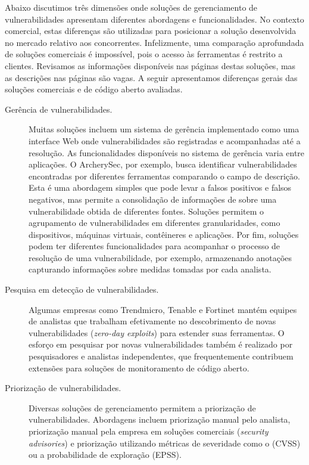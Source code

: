 Abaixo discutimos três dimensões onde soluções de gerenciamento de vulnerabilidades apresentam diferentes abordagens e funcionalidades. No contexto comercial, estas diferenças são utilizadas para posicionar a solução desenvolvida no mercado relativo aos concorrentes. Infelizmente, uma comparação aprofundada de soluções comerciais é impossível, pois o acesso às ferramentas é restrito a clientes. Revisamos as informações disponíveis nas páginas destas soluções, mas as descrições nas páginas são vagas. A seguir apresentamos diferenças gerais das soluções comerciais e de código aberto avaliadas.

\begin{description}

    \item[Gerência de vulnerabilidades.] Muitas soluções incluem um sistema de gerência implementado como uma interface Web onde vulnerabilidades são registradas e acompanhadas até a resolução. As funcionalidades disponíveis no sistema de gerência varia entre aplicações. O ArcherySec, por exemplo, busca identificar vulnerabilidades encontradas por diferentes ferramentas comparando o campo de descrição. Esta é uma abordagem simples que pode levar a falsos positivos e falsos negativos, mas permite a consolidação de informações de sobre uma vulnerabilidade obtida de diferentes fontes. Soluções permitem o agrupamento de vulnerabilidades em diferentes granularidades, como dispositivos, máquinas virtuais, contêineres e aplicações. Por fim, soluções podem ter diferentes funcionalidades para acompanhar o processo de resolução de uma vulnerabilidade, por exemplo, armazenando anotações capturando informações sobre medidas tomadas por cada analista.

    \item[Pesquisa em detecção de vulnerabilidades.] Algumas empresas como Trendmicro, Tenable e Fortinet mantém equipes de analistas que trabalham efetivamente no descobrimento de novas vulnerabilidades (\emph{zero-day exploits}) para estender suas ferramentas. O esforço em pesquisar por novas vulnerabilidades também é realizado por pesquisadores e analistas independentes, que frequentemente contribuem extensões para soluções de monitoramento de código aberto.

    \item[Priorização de vulnerabilidades.]  Diversas soluções de gerenciamento permitem a priorização de vulnerabilidades. Abordagens incluem priorização manual pelo analista, priorização manual pela empresa em soluções comerciais (\emph{security advisories}) e priorização utilizando métricas de severidade como o (CVSS) ou a probabilidade de exploração (EPSS).


\end{description}
